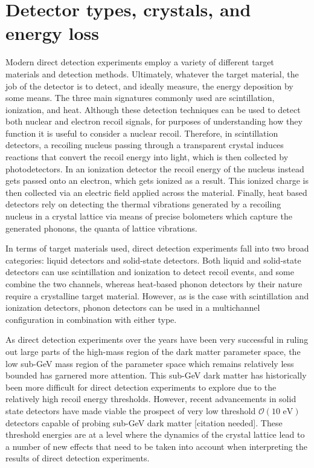 \documentclass[b5paper, 10pt, twoside]{book}
\newcommand{\typographersred}{scp-red-dark-3}
\newcommand{\needcite}{\textcolor{\typographersred}{[citation needed]}}
\begin{document}
\chapter{Detector types, crystals, and energy loss}
\label{chap:energy-loss}

Modern direct detection experiments employ a variety of different target materials and detection methods. Ultimately, whatever the target material, the job of the detector is to detect, and ideally measure, the energy deposition by some means. The three main signatures commonly used are scintillation, ionization, and heat. Although these detection techniques can be used to detect both nuclear and electron recoil signals, for purposes of understanding how they function it is useful to consider a nuclear recoil. Therefore, in scintillation detectors, a recoiling nucleus passing through a transparent crystal induces reactions that convert the recoil energy into light, which is then collected by photodetectors. In an ionization detector the recoil energy of the nucleus instead gets passed onto an electron, which gets ionized as a result. This ionized charge is then collected via an electric field applied across the material. Finally, heat based detectors rely on detecting the thermal vibrations generated by a recoiling nucleus in a crystal lattice via means of precise bolometers which capture the generated phonons, the quanta of lattice vibrations.

In terms of target materials used, direct detection experiments fall into two broad categories: liquid detectors and solid-state detectors. Both liquid and solid-state detectors can use scintillation and ionization to detect recoil events, and some combine the two channels, whereas heat-based phonon detectors by their nature require a crystalline target material. However, as is the case with scintillation and ionization detectors, phonon detectors can be used in a multichannel configuration in combination with either type.

As direct detection experiments over the years have been very successful in ruling out large parts of the high-mass region of the dark matter parameter space, the low sub-GeV mass region of the parameter space which remains relatively less bounded has garnered more attention. This sub-GeV dark matter has historically been more difficult for direct detection experiments to explore due to the relatively high recoil energy thresholds. However, recent advancements in solid state detectors have made viable the prospect of very low threshold $\mathcal{O}(\text{10 eV})$ detectors capable of probing sub-GeV dark matter \needcite. These threshold energies are at a level where the dynamics of the crystal lattice lead to a number of new effects that need to be taken into account when interpreting the results of direct detection experiments.
\end{document}
